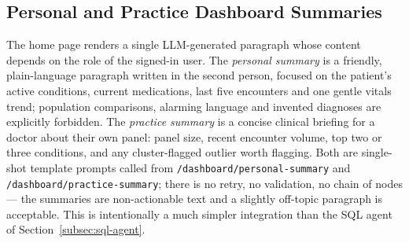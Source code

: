 \subsection{Personal and Practice Dashboard Summaries}

The home page renders a single LLM-generated paragraph whose content depends on the role of the signed-in user. The \emph{personal summary} is a friendly, plain-language paragraph written in the second person, focused on the patient's active conditions, current medications, last five encounters and one gentle vitals trend; population comparisons, alarming language and invented diagnoses are explicitly forbidden. The \emph{practice summary} is a concise clinical briefing for a doctor about their own panel: panel size, recent encounter volume, top two or three conditions, and any cluster-flagged outlier worth flagging. Both are single-shot template prompts called from \texttt{/dashboard/personal-summary} and \texttt{/dashboard/practice-summary}; there is no retry, no validation, no chain of nodes --- the summaries are non-actionable text and a slightly off-topic paragraph is acceptable. This is intentionally a much simpler integration than the SQL agent of Section~\ref{subsec:sql-agent}.
